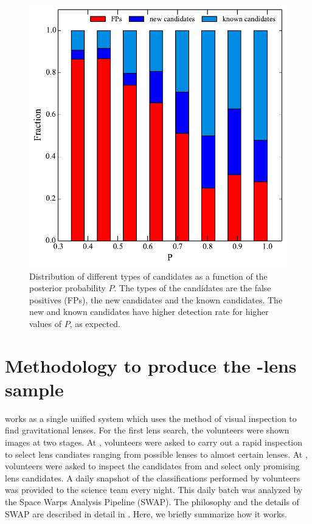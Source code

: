 \documentclass[useAMS,usenatbib,a4paper]{mn2e}
\begin{document}
\begin{figure}
\begin{center}
\includegraphics[scale=0.6]{cand_fp_P_frac.pdf}
\caption{ \label{fig:stackP}
Distribution of different types of candidates as a function of the
posterior probability $P$. The types of the candidates are the false
positives (FPs), the new candidates and the known candidates. The new
and known candidates have higher detection rate for higher values of $P$,
as expected.}
\end{center}
\end{figure}


\section{Methodology to produce the \sw-\cfhtls lens sample}
\label{sec:swap}

\sw works as a single unified system which uses the method of visual
inspection to find gravitational lenses. For the first \sw lens search,
the volunteers were shown images at two stages. At \StageOne, volunteers
were asked to carry out a rapid inspection to select lens candiates
ranging from possible lenses to almost certain lenses. At \StageTwo,
volunteers were asked to inspect the candidates from \StageOne and select
only promising lens candidates. A daily snapshot of the classifications
performed by volunteers was provided to the science team every night.
This daily batch was analyzed by the Space Warps Analysis Pipeline
(SWAP). The philosophy and the details of SWAP are described in detail
in \PaperOne. Here, we briefly summarize how it works.
\end{document}
